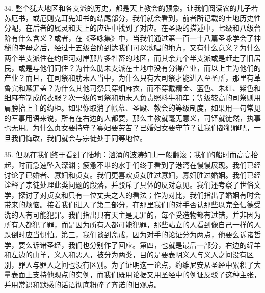 34. 整个犹大地区和各支派的历史，都是天上教会的预象。让我们阅读农的儿子若苏厄书，或厄则克耳先知书的结尾部分，我们就会看到，前者所记载的土地历史性分配，在后者的属灵和天上的应许中找到了对应。在圣殿的描述中，七级和八级台阶有什么含义？或者，在《圣咏集》中，当我们通过第一百一十八篇圣咏学会了神秘的字母之后，经过十五级台阶到达我们可以歌唱的地方，又有什么意义？为什么两个半支派住在约但河对岸那片多牲畜的地区，而其余九个半支派或是赶走了旧居民，或是与他们同住？为什么肋未支派在土地中没有分得产业，而以上主为他们的产业？而且，在司祭和肋未人当中，为什么只有大司祭才能进入至圣所，那里有革鲁宾和赎罪盖？为什么其他司祭只穿细麻衣，而不穿戴精金、蓝色、朱红、紫色和细麻布制成的衣服？次一级的司祭和肋未人负责照料牛和车；等级较高的司祭则用肩膀抬上主的约柜。如果你取消了帐幕、圣殿、教会的等级制度，如果用一句常见的军事用语来说，所有在右边的人都要，那么主教就毫无意义，司铎就徒然，执事也无用。为什么贞女要持守？寡妇要劳苦？已婚妇女要守节？让我们都犯罪吧，一旦我们悔改，我们就会与宗徒处于同等地位。\par

35. 但现在我们终于看到了陆地：汹涌的波涛如山一般翻滚；我们的船时而高高抬起，时而急速坠入深渊；疲惫不堪的水手们终于看到了港湾在慢慢展现。我们已经讨论了已婚者、寡妇和贞女。我们更喜欢贞女胜过寡妇，寡妇胜过婚姻。我们已经诠释了宗徒处理此类问题的段落，并驳斥了具体的反对意见。我们还考察了世俗文学，探讨了对贞女和只有一位丈夫之人的看法；作为对比，我们指出了婚姻有时会带来的烦恼。接着我们进入了第二部分，在那里我们的对手否认那些以完全信德受洗的人有可能犯罪。我们指出只有天主是无罪的，每个受造物都有过错，并非因为所有人都犯了罪，而是因为所有人都可能犯罪，那些站立的人看到像自己一样的人跌倒时应当惧怕。第三，我们谈到斋戒，因为对手的论证分为两点，他要么诉诸哲学，要么诉诸圣经，我们也分别作了回应。第四，也就是最后一部分，右边的绵羊和左边的山羊，义人和恶人，被分为两类，目的是要表明义人与义人之间没有区别，罪人与罪人之间也没有区别。为了证明这一论点，约维尼安从圣经中累积了大量表面上支持他观点的实例，而我们既用论据又用圣经中的例证反驳了这种主张，并用常识和默感的话语彻底粉碎了齐诺的旧观点。\par

